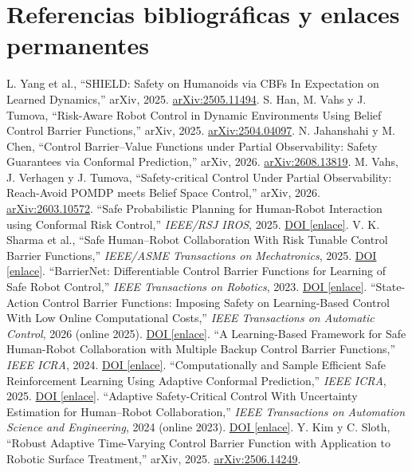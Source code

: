 \documentclass[10pt,a4paper,twocolumn]{article}
\newcommand{\arxiv}[1]{\href{https://arxiv.org/abs/#1}{arXiv:#1}}
\newcommand{\doi}[1]{\href{https://doi.org/#1}{DOI \textsf{[enlace]}}}
\begin{document}
\section*{Referencias bibliográficas y enlaces permanentes}
\vspace{-4pt}
\begin{thebibliography}{30}\setlength{\itemsep}{1pt}\footnotesize
{} L. Yang et al., ``SHIELD: Safety on Humanoids via CBFs In Expectation on Learned Dynamics,'' arXiv, 2025. \arxiv{2505.11494}.
 S. Han, M. Vahs y J. Tumova, ``Risk-Aware Robot Control in Dynamic Environments Using Belief Control Barrier Functions,'' arXiv, 2025. \arxiv{2504.04097}.
 N. Jahanshahi y M. Chen, ``Control Barrier--Value Functions under Partial Observability: Safety Guarantees via Conformal Prediction,'' arXiv, 2026. \arxiv{2608.13819}.
 M. Vahs, J. Verhagen y J. Tumova, ``Safety-critical Control Under Partial Observability: Reach-Avoid POMDP meets Belief Space Control,'' arXiv, 2026. \arxiv{2603.10572}.
 ``Safe Probabilistic Planning for Human-Robot Interaction using Conformal Risk Control,'' \emph{IEEE/RSJ IROS}, 2025. \doi{10.1109/IROS60139.2025.11247339}.
 V. K. Sharma et al., ``Safe Human--Robot Collaboration With Risk Tunable Control Barrier Functions,'' \emph{IEEE/ASME Transactions on Mechatronics}, 2025. \doi{10.1109/TMECH.2025.3572047}.
 ``BarrierNet: Differentiable Control Barrier Functions for Learning of Safe Robot Control,'' \emph{IEEE Transactions on Robotics}, 2023. \doi{10.1109/TRO.2023.3249564}.
 ``State-Action Control Barrier Functions: Imposing Safety on Learning-Based Control With Low Online Computational Costs,'' \emph{IEEE Transactions on Automatic Control}, 2026 (online 2025). \doi{10.1109/TAC.2025.3636804}.
 ``A Learning-Based Framework for Safe Human-Robot Collaboration with Multiple Backup Control Barrier Functions,'' \emph{IEEE ICRA}, 2024. \doi{10.1109/ICRA57147.2024.10611634}.
 ``Computationally and Sample Efficient Safe Reinforcement Learning Using Adaptive Conformal Prediction,'' \emph{IEEE ICRA}, 2025. \doi{10.1109/ICRA55743.2025.11127570}.
 ``Adaptive Safety-Critical Control With Uncertainty Estimation for Human--Robot Collaboration,'' \emph{IEEE Transactions on Automation Science and Engineering}, 2024 (online 2023). \doi{10.1109/TASE.2023.3320873}.
 Y. Kim y C. Sloth, ``Robust Adaptive Time-Varying Control Barrier Function with Application to Robotic Surface Treatment,'' arXiv, 2025. \arxiv{2506.14249}.

\end{thebibliography}
\end{document}
